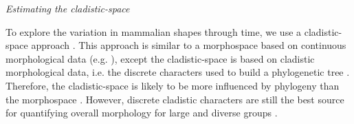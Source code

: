 \documentclass[12pt,letterpaper]{article}
\renewcommand{\subsection}[1]{%
\bigskip
\begin{center}
\begin{large}
\normalfont\itshape #1
\end{large}
\end{center}}
\begin{document}

\subsection{Estimating the cladistic-space} %
To explore the variation in mammalian shapes
through time, we use a cladistic-space approach \cite{Foote01071994,Foote29111996,Wesley-Hunt2005,Brusatte12092008,friedmanexplosive2010,toljagictriassic-jurassic2013}. This approach is similar to a morphospace based on continuous morphological data (e.g. \cite{finlay2015morphological}), except the cladistic-space is based on cladistic morphological data, i.e. the discrete characters used to build a phylogenetic tree 
. Therefore, the cladistic-space is likely to be more influenced by phylogeny than the morphospace \citep{Foote29111996,Wagner01011997}. However, discrete cladistic characters are still the best source for quantifying overall morphology for large and diverse groups \citep{Brusatte12092008}. %

\end{document}
